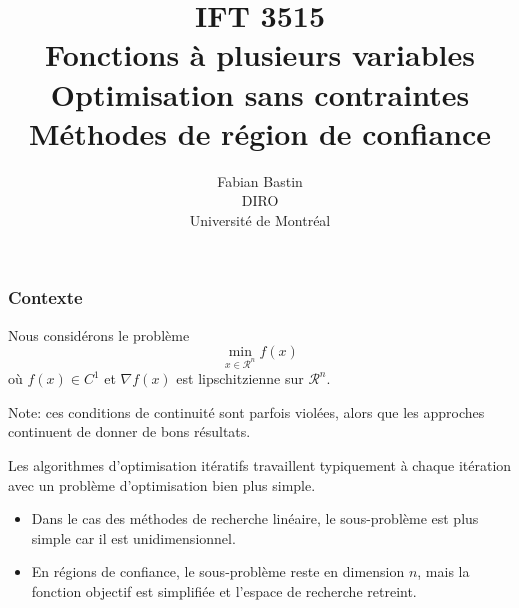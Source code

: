 \documentclass[t,usepdftitle=false]{beamer}
\title[IFT3515]{IFT 3515\\Fonctions à plusieurs variables\\Optimisation sans contraintes\\Méthodes de région de confiance}
\author[Fabian Bastin]{Fabian Bastin\\DIRO\\Université de Montréal}
\date{}
\def\cR{\mathcal{R}}
\begin{document}
\frame{\titlepage}


\begin{frame}
\frametitle{Contexte}

Nous considérons le problème
$$
\min_{x \in \cR^n} f(x)
$$
où $f(x) \in C^1$ et $\nabla f(x)$ est lipschitzienne sur $\cR^n$.

\mbox{}

Note: ces conditions de continuité sont parfois violées, alors que les approches continuent de donner de bons résultats.

\mbox{}

Les algorithmes d'optimisation itératifs travaillent typiquement à chaque itération avec un problème d'optimisation bien plus simple.
\begin{itemize}
\item
Dans le cas des méthodes de recherche linéaire, le sous-problème est plus simple car il est unidimensionnel.
\item
En régions de confiance, le sous-problème reste en dimension $n$, mais la fonction objectif est simplifiée et l'espace de recherche retreint.
\end{itemize}

\end{frame}
\end{document}
